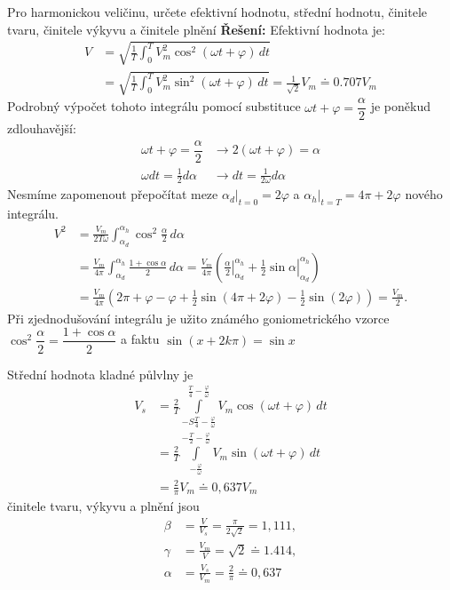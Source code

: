 \begin{example}\label{TEO:exam007}
  Pro harmonickou veličinu, určete efektivní hodnotu, střední hodnotu, činitele tvaru, činitele
  výkyvu a činitele plnění \newline
  \textbf{Řešení:} Efektivní hodnota je:
  \begin{align}
    V &= \sqrt{\frac{1}{T}\int_0^TV_m^2\cos^2{(\omega t + \varphi)}\,dt}    \nonumber  \\
      &= \sqrt{\frac{1}{T}\int_0^TV_m^2\sin^2{(\omega t + \varphi)}\,dt} = 
         \frac{1}{\sqrt{2}}V_m \doteq 0.707 V_m   
  \end{align}
  Podrobný výpočet tohoto integrálu pomocí substituce $\omega t + \varphi=\dfrac{\alpha}{2}$ je
  poněkud zdlouhavější:
  \begin{align*}
      \omega t + \varphi=\dfrac{\alpha}{2}   
    & \rightarrow  2(\omega t + \varphi) = \alpha      \\ 
      \omega dt = \frac{1}{2}d\alpha         
    & \rightarrow dt = \frac{1}{2\omega}d\alpha
  \end{align*}
  Nesmíme zapomenout přepočítat meze $\alpha_d\lvert_{t=0}=2\varphi$ a $\alpha_h\lvert_{t=T} = 
  4\pi+2\varphi$ nového integrálu.
  \begin{align*}
    V^2  &= \frac{V_m}{2T\omega}\int_{\alpha_d}^{\alpha_h}\cos^2\frac{\alpha}{2}\,d\alpha    \\
         &= \frac{V_m}{4\pi}\int_{\alpha_d}^{\alpha_h}\frac{1+\cos\alpha}{2}\,d\alpha  
          = \frac{V_m}{4\pi}\left(\left.\frac{\alpha}{2}\right\rvert_{\alpha_d}^{\alpha_h}
          + \left.\frac{1}{2}\sin\alpha\right\rvert_{\alpha_d}^{\alpha_h}\right)             \\
         &= \frac{V_m}{4\pi}\left(2\pi+\varphi-\varphi 
          + \frac{1}{2}\sin(4\pi+2\varphi)
          - \frac{1}{2}\sin(2\varphi)\right) = \frac{V_m}{2}.  
  \end{align*}  
  Při zjednodušování integrálu je užito známého goniometrického vzorce \(\cos^2\dfrac{\alpha}{2} = 
  \dfrac{1+\cos\alpha}{2}\) a faktu \(\sin(x+2k\pi)=\sin x\)
  
  Střední hodnota kladné půlvlny je 
  \begin{align*}
    V_s &= \frac{2}{T}\int\limits_{-S\frac{T}{4}-
           \frac{\varphi}{\omega}}^{\frac{T}{4}-
           \frac{\varphi}{\omega}}{V_m\cos(\omega t +\varphi)}\,dt                            \\
        &= \frac{2}{T}\int\limits_{-\frac{\varphi}{\omega}}^{-\frac{T}{2}-
           \frac{\varphi}{\omega}}{V_m\sin(\omega t +\varphi)}\,dt                            \\
        &= \frac{2}{\pi}V_m \doteq 0,637V_m
  \end{align*}
  činitele tvaru, výkyvu a plnění jsou 
  \begin{align*}
    \beta  &=\frac{V}{V_s}   =\frac{\pi}{2\sqrt{2}}=1,111, \\ 
    \gamma &=\frac{V_m}{V}   =\sqrt{2}\doteq1.414,         \\
    \alpha &=\frac{V_s}{V_m} =\frac{2}{\pi}\doteq0,637 
  \end{align*}
\end{example}